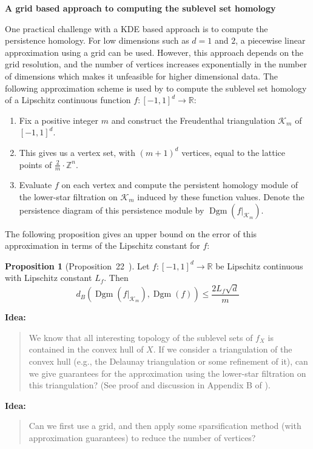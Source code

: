 \documentclass[10pt,a4paper]{article}
\theoremstyle{definition}
\newtheorem{prop}{Proposition}[thm]
\newcommand{\R}{\mathbb{R}}
\newenvironment{idea}{%
	\begin{tcolorbox}[colback=green, breakable, sharp corners]
		\textbf{Idea: }
		\medskip
		\begin{quote}
			\centering
}{\end{quote}\medskip\end{tcolorbox}}
\begin{document}
\textbf{A grid based approach to computing the sublevel set homology}

One practical challenge with a KDE based approach is to compute the persistence homology. For low dimensions such as $d=1$ and $2$, a piecewise linear approximation using a grid can be used. However, this approach depends on the grid resolution, and the number of vertices increases exponentially in the number of dimensions which makes it unfeasible for higher dimensional data. The following approximation scheme is used by \autocite{Hoefgeest2022} to compute the sublevel set homology of a Lipschitz continuous function $f\colon[-1,1]^d\to\R$:
\begin{enumerate}
	\item Fix a positive integer $m$ and construct the Freudenthal triangulation $\mathcal{K}_m$ of $[-1,1]^d$.
	\item This gives us a vertex set, with $(m+1)^d$ vertices, equal to the lattice points of $\frac{2}{m}\cdot\mathbb{Z}^n$.
	\item Evaluate $f$ on each vertex and compute the persistent homology module of the lower-star filtration on $\mathcal{K}_m$ induced by these function values. Denote the persistence diagram of this persistence module by $\operatorname{Dgm}(f\vert_{\mathcal{K}_m})$.
\end{enumerate}
The following proposition gives an upper bound on the error of this approximation in terms of the Lipschitz constant for $f$:
\begin{prop}[Proposition~22~\autocite{Hoefgeest2022}]
	Let $f\colon[-1,1]^d\to\R$ be Lipschitz continuous with Lipschitz constant $L_f$. Then
	$$
	d_B\left(\operatorname{Dgm}(f\vert_{\mathcal{K}_m}), \operatorname{Dgm}(f)\right)\leq \frac{2L_f\sqrt{d}}{m}
	$$
\end{prop}

\begin{idea}
	We know that all interesting topology of the sublevel sets of $f_X$ is contained in the convex hull of $X$. If we consider a triangulation of the convex hull (e.g., the Delaunay triangulation or some refinement of it), can we give guarantees for the approximation using the lower-star filtration on this triangulation? (See proof and discussion in Appendix B of \autocite{Hoefgeest2022}).
\end{idea}

\begin{idea}
	Can we first use a grid, and then apply some sparsification method (with approximation guarantees) to reduce the number of vertices?
\end{idea}

\printbibliography
\end{document}
